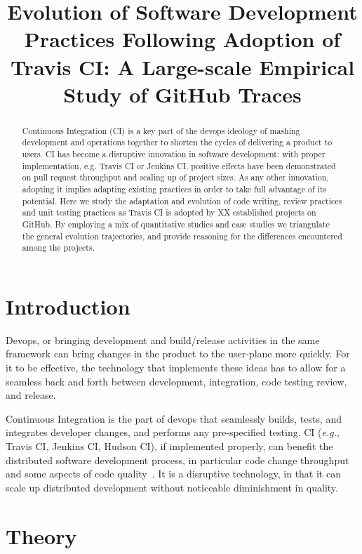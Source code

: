 \documentclass[conference]{IEEEtran}
\newcommand{\eg}{{\emph{e.g.}},\xspace}
\begin{document}
\title{Evolution of Software Development Practices
Following Adoption of Travis CI: A Large-scale Empirical Study of GitHub Traces}

\author
{\IEEEauthorblockN{}
\IEEEauthorblockA{}
}
\maketitle
\begin{abstract}
Continuous Integration (CI) is a key part of the devops ideology of mashing development and operations together to shorten the cycles of delivering a product to users. CI has become a disruptive innovation in software development: with proper implementation, e.g. Travis CI or Jenkins CI, positive effects have been demonstrated on pull request throughput and scaling up of project sizes. As any other innovation, adopting it implies adapting existing practices in order to take full advantage of its potential. Here we study the adaptation and evolution of code writing, review practices and unit testing practices as Travis CI is adopted by XX established projects on GitHub. By employing a mix of quantitative studies and case studies we triangulate the general evolution trajectories, and provide reasoning for the differences encountered among the projects.
\end{abstract}

\section{Introduction}
Devops, or bringing development and build/release activities in the same framework can bring changes in the product to the user-plane more quickly. For it to be effective, the technology that implements these ideas has to allow for a seamless back and forth between development, integration, code testing review, and release. 

Continuous Integration is the part of devops that seamlessly builds, tests, and integrates developer changes, and performs any pre-specified testing. CI (\eg Travis CI, Jenkins CI, Hudson CI), if implemented properly, can benefit the distributed software development process, in particular code change throughput~\cite{Stolberg} and some aspects of code quality~\cite{VasilescuYWDF15}. It is a disruptive technology, in that it can scale up distributed development without noticeable diminishment in quality.

\section{Theory}
\end{document}
